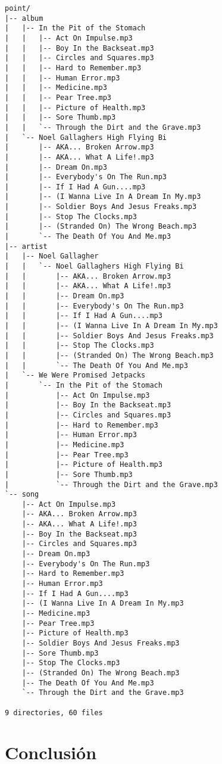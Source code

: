 \documentclass[a4paper,oneside]{report}
\begin{document}
\begin{lstlisting}
point/
|-- album
|   |-- In the Pit of the Stomach
|   |   |-- Act On Impulse.mp3
|   |   |-- Boy In the Backseat.mp3
|   |   |-- Circles and Squares.mp3
|   |   |-- Hard to Remember.mp3
|   |   |-- Human Error.mp3
|   |   |-- Medicine.mp3
|   |   |-- Pear Tree.mp3
|   |   |-- Picture of Health.mp3
|   |   |-- Sore Thumb.mp3
|   |   `-- Through the Dirt and the Grave.mp3
|   `-- Noel Gallaghers High Flying Bi
|       |-- AKA... Broken Arrow.mp3
|       |-- AKA... What A Life!.mp3
|       |-- Dream On.mp3
|       |-- Everybody's On The Run.mp3
|       |-- If I Had A Gun....mp3
|       |-- (I Wanna Live In A Dream In My.mp3
|       |-- Soldier Boys And Jesus Freaks.mp3
|       |-- Stop The Clocks.mp3
|       |-- (Stranded On) The Wrong Beach.mp3
|       `-- The Death Of You And Me.mp3
|-- artist
|   |-- Noel Gallagher
|   |   `-- Noel Gallaghers High Flying Bi
|   |       |-- AKA... Broken Arrow.mp3
|   |       |-- AKA... What A Life!.mp3
|   |       |-- Dream On.mp3
|   |       |-- Everybody's On The Run.mp3
|   |       |-- If I Had A Gun....mp3
|   |       |-- (I Wanna Live In A Dream In My.mp3
|   |       |-- Soldier Boys And Jesus Freaks.mp3
|   |       |-- Stop The Clocks.mp3
|   |       |-- (Stranded On) The Wrong Beach.mp3
|   |       `-- The Death Of You And Me.mp3
|   `-- We Were Promised Jetpacks
|       `-- In the Pit of the Stomach
|           |-- Act On Impulse.mp3
|           |-- Boy In the Backseat.mp3
|           |-- Circles and Squares.mp3
|           |-- Hard to Remember.mp3
|           |-- Human Error.mp3
|           |-- Medicine.mp3
|           |-- Pear Tree.mp3
|           |-- Picture of Health.mp3
|           |-- Sore Thumb.mp3
|           `-- Through the Dirt and the Grave.mp3
`-- song
    |-- Act On Impulse.mp3
    |-- AKA... Broken Arrow.mp3
    |-- AKA... What A Life!.mp3
    |-- Boy In the Backseat.mp3
    |-- Circles and Squares.mp3
    |-- Dream On.mp3
    |-- Everybody's On The Run.mp3
    |-- Hard to Remember.mp3
    |-- Human Error.mp3
    |-- If I Had A Gun....mp3
    |-- (I Wanna Live In A Dream In My.mp3
    |-- Medicine.mp3
    |-- Pear Tree.mp3
    |-- Picture of Health.mp3
    |-- Soldier Boys And Jesus Freaks.mp3
    |-- Sore Thumb.mp3
    |-- Stop The Clocks.mp3
    |-- (Stranded On) The Wrong Beach.mp3
    |-- The Death Of You And Me.mp3
    `-- Through the Dirt and the Grave.mp3

9 directories, 60 files
\end{lstlisting}

\chapter{Conclusión}
\end{document}
